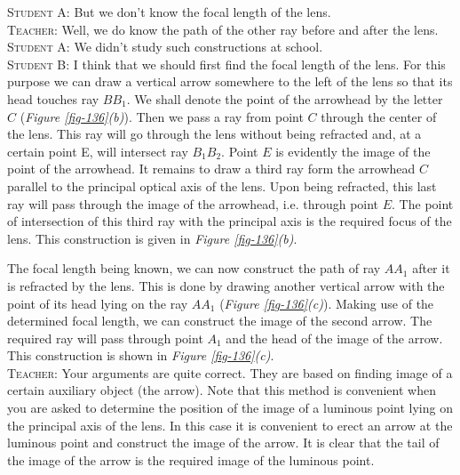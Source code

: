 \documentclass[a4paper,sfsidenotes]{tufte-book}
\begin{document}
\textsc{Student A:} But we don't know the focal length of the lens. 
\\
\textsc{Teacher:} Well, we do know the path of the other ray before and after the lens.
\\
\textsc{Student A:} We didn't study such constructions at school.
\\
\textsc{Student B:} I think that we should first find the focal length of the lens. For this purpose we can draw a vertical arrow somewhere to the left of the lens so that its head touches ray $BB_{1}$. We shall denote the point of the arrowhead by the letter $C$ (\emph{Figure \ref{fig-136}(b)}). Then we pass a ray from point $C$ through the center of the lens. This ray will go through the lens without being refracted and, at a certain point E, will intersect ray $B_{1}B_{2}$. Point $E$ is evidently the image of the point of the arrowhead. It remains to draw a third ray form the arrowhead $C$ parallel to the principal optical axis of the lens. Upon being refracted, this last ray will pass through the image of the arrowhead, i.e. through point $E$. The point of intersection of this third ray with the principal axis is the required focus of the lens. This construction is given in \emph{Figure \ref{fig-136}(b)}. 

The focal length being known, we can now construct the path of ray $AA_{1}$ after it is refracted by the lens. This is done by drawing another vertical arrow with the point of its head lying on the ray $AA_{1}$ (\emph{Figure \ref{fig-136}(c)}). Making use of the determined focal length, we can construct the image of the second arrow. The required ray will pass through point $A_{1}$ and the head of the image of the arrow. This construction is shown in \emph{Figure \ref{fig-136}(c)}.
\\
\textsc{Teacher:} Your arguments are quite correct. They are based on finding image of a certain auxiliary object (the arrow). Note that this method is convenient when you are asked to determine the position of the image of a luminous point lying on the principal axis of the lens. In this case it is convenient to erect an arrow at the luminous point and construct the image of the arrow. It is clear that the tail of the image of the arrow is the required image of the luminous point.
\end{document}

